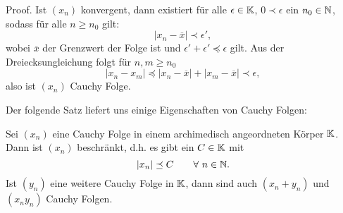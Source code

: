 \begin{emphBox}{}{}
Proof. Ist \((x_n)\) konvergent, dann existiert für alle \(\epsilon \in \mathbb{K}\), \(0 \prec \epsilon\) ein \(n_0 \in \mathbb{N}\), sodass für alle \(n \geq n_0\) gilt:
\begin{equation*}
| x_n - \overline{x} | \prec  \epsilon',
\end{equation*}
wobei \(\overline{x}\) der Grenzwert der Folge ist und \(\epsilon'+\epsilon' \preceq \epsilon\) gilt. Aus der Dreiecksungleichung folgt für \(n,m \geq n_0\)
\begin{equation*}
| x_n - x_m | \preceq  | x_n - \overline{x} |  +  | x_m - \overline{x} | \prec \epsilon,
\end{equation*}
also ist \((x_n)\) Cauchy Folge.
\end{emphBox}

Der folgende Satz liefert uns einige Eigenschaften von Cauchy Folgen:
\label{grundlagen/zahlensysteme:theorem-16}
\begin{theorem}{}{}



Sei \((x_n)\) eine Cauchy Folge in einem archimedisch angeordneten Körper \(\mathbb{K}\). Dann ist \((x_n)\) beschränkt, d.h. es gibt ein \(C \in \mathbb{K}\) mit
\begin{equation*}
|x_n| \preceq C \qquad \forall~n \in \mathbb{N}.
\end{equation*}
Ist \((y_n)\) eine weitere Cauchy Folge in \(\mathbb{K}\), dann sind auch \((x_n+y_n)\) und \((x_n y_n)\) Cauchy Folgen.
\end{theorem}


